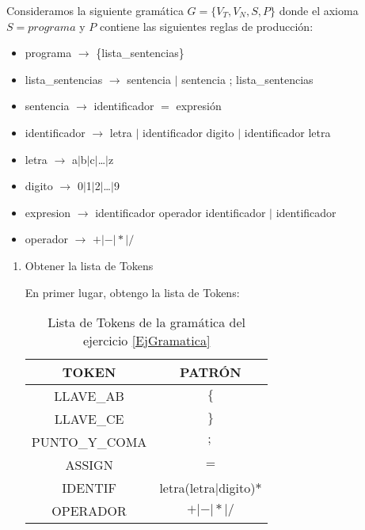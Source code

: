 \begin{ejercicio}\label{EjGramatica}
    Consideramos la siguiente gramática $G=\{V_T, V_N, S, P\}$ donde el axioma $S=programa$ y $P$ contiene las siguientes reglas de producción:
    \begin{itemize}
        \item programa $\longrightarrow$ \{lista\_sentencias\}
        \item lista\_sentencias $\longrightarrow$ sentencia $|$ sentencia ; lista\_sentencias
        \item sentencia $\longrightarrow$ identificador $=$ expresión
        
        \item identificador $\longrightarrow$ letra $|$ identificador digito $|$ identificador letra

        \item letra $\longrightarrow$ a$|$b$|$c$|$\dots$|$z

        \item digito $\longrightarrow$ 0$|$1$|$2$|$\dots$|$9

        \item expresion $\longrightarrow$ identificador operador identificador $|$ identificador

        \item operador $\longrightarrow$ $+|-|\ast|/$
    \end{itemize}

    \begin{enumerate}
        \item Obtener la lista de Tokens

        En primer lugar, obtengo la lista de Tokens:
        \begin{table}[H]
            \centering
            \begin{tabular}{c|c}
                TOKEN & PATRÓN \\ \hline
                LLAVE\_AB & $\{$ \\
                LLAVE\_CE & $\}$ \\
                PUNTO\_Y\_COMA & $;$ \\
                ASSIGN & $=$ \\
                IDENTIF & letra(letra$|$digito)$\ast$ \\
                OPERADOR & $+|-|\ast|/$
            \end{tabular}
            \caption{Lista de Tokens de la gramática del ejercicio \ref{EjGramatica}}
            \label{tab:EjGramatica}
        \end{table}



\end{enumerate}
\end{ejercicio}
